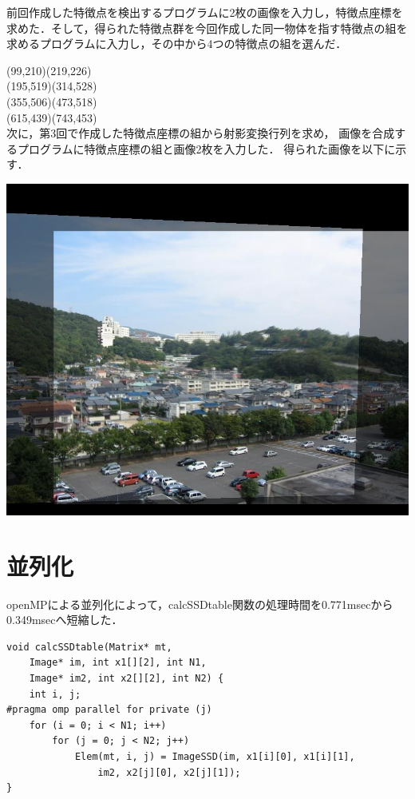\documentclass[11pt]{jarticle}
\begin{document}
前回作成した特徴点を検出するプログラムに2枚の画像を入力し，特徴点座標を
求めた．そして，得られた特徴点群を今回作成した同一物体を指す特徴点の組を
求めるプログラムに入力し，その中から4つの特徴点の組を選んだ．

\noindent
(99,210)(219,226)\\
(195,519)(314,528)\\
(355,506)(473,518)\\
(615,439)(743,453)\\


次に，第3回で作成した特徴点座標の組から射影変換行列を求め，
画像を合成するプログラムに特徴点座標の組と画像2枚を入力した．
得られた画像を以下に示す．

\includegraphics[scale=.6]{./img/out.jpg}

\section{並列化}

openMPによる並列化によって，calcSSDtable関数の処理時間を0.771msecから
0.349msecへ短縮した．

\begin{lstlisting}
void calcSSDtable(Matrix* mt,
    Image* im, int x1[][2], int N1,
    Image* im2, int x2[][2], int N2) {
    int i, j;
#pragma omp parallel for private (j)
    for (i = 0; i < N1; i++)
        for (j = 0; j < N2; j++)
            Elem(mt, i, j) = ImageSSD(im, x1[i][0], x1[i][1],
                im2, x2[j][0], x2[j][1]);
}
\end{lstlisting}
\end{document}
